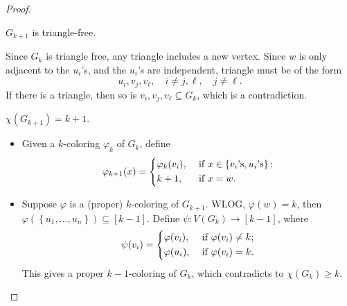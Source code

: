\begin{proof}
\begin{figure}[H]
\begin{tikzpicture}
        \end{tikzpicture}
    \end{figure}
    \begin{claim}
        \(G_{k+1}\) is triangle-free. 
    \end{claim}                  
    \begin{explanation}
        Since \(G_k\) is triangle free, any triangle includes a new vertex. Since \(w\) is only adjacent to the \(u_i\)'s, and the \(u_i\)'s are independent, triangle must be of the form 
        \[
            u_i, v_j, v_{\ell }, \quad i \neq j, \ell , \quad j \neq \ell.
        \]    
        If there is a triangle, then so is \(v_i, v_j, v_{\ell} \subseteq G_k\), which is a contradiction.
    \end{explanation}

    \begin{claim}
        \(\chi (G_{k+1}) = k + 1\). 
    \end{claim}
    \begin{explanation}
        \hfill 
        \begin{itemize}
            \item [(\(\le\))] Given a \(k\)-coloring \(\varphi _k\) of \(G_k\), define 
            \[
                \varphi _{k+1}(x) = \begin{dcases}
                    \varphi _k(v_i), &\text{ if } x \in \left\{ v_{i} \text{'s} , u_i \text{'s}  \right\}  ;\\
                    k + 1, &\text{ if } x = w.
                \end{dcases}
            \]
            \item [(\(\ge\))] Suppose \(\varphi \) is a (proper) \(k\)-coloring of \(G_{k+1}\). WLOG, \(\varphi (w) = k\), then \(\varphi (\left\{ u_1, \dots , u_n \right\} ) \subseteq [k - 1]\). Define \(\psi : V(G_k) \to [k - 1]\), where 
            \[
                \psi (v_i) = \begin{dcases}
                    \varphi (v_i), &\text{ if } \varphi (v_i) \neq k ;\\
                    \varphi (u_i), &\text{ if } \varphi (v_i) = k .
                \end{dcases}
            \]
            This gives a proper \(k - 1\)-coloring of \(G_k\), which contradicts to \(\chi (G_k) \ge k\).  
        \end{itemize}
    \end{explanation}
\end{proof}

